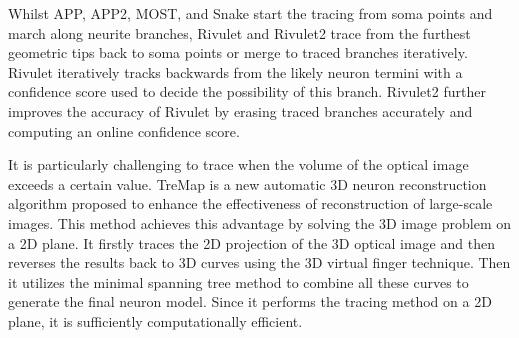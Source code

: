 \documentclass[conference]{IEEEtran}
\begin{document}
Whilst APP, APP2, MOST, and Snake start the tracing from soma points and march along neurite branches, Rivulet and Rivulet2 trace from the furthest geometric tips back to soma points or merge to traced branches iteratively. Rivulet iteratively tracks backwards from the likely neuron termini with a confidence score used to decide the possibility of this branch. Rivulet2 further improves the accuracy of Rivulet by erasing traced branches accurately and computing an online confidence score.

It is particularly challenging to trace when the volume of the optical image exceeds a certain value. TreMap \cite{zhou2016tremap} is a new automatic 3D neuron reconstruction algorithm proposed to enhance the effectiveness of reconstruction of large-scale images. This method achieves this advantage by solving the 3D image problem on a 2D plane. It firstly traces the 2D projection of the 3D optical image and then reverses the results back to 3D curves using the 3D virtual finger technique. Then it utilizes the minimal spanning tree method to combine all these curves to generate the final neuron model. Since it performs the tracing method on a 2D plane, it is sufficiently computationally efficient.
\end{document}
